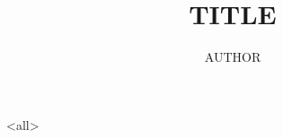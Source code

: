 \documentclass[ignoreframetext]{beamer}
\begin{document}
\title{%
  TITLE
}
\author{AUTHOR}

\begin{frame}
  \maketitle
\end{frame}

\mode<all>

\mode*
%
\end{document}
